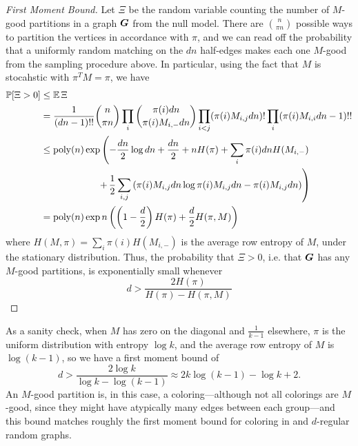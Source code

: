 \begin{proof}[First Moment Bound]
    Let $\Xi$ be the random variable counting the number of $M$-good partitions in a graph $\boldsymbol{G}$ from the null model. There are ${n \choose \pi n}$ possible ways to partition the vertices in accordance with $\pi$, and we can read off the probability that a uniformly random matching on the $dn$ half-edges makes each one $M$-good from the sampling procedure above. In particular, using the fact that $M$ is stocahstic with $\pi^T M = \pi$, we have
    \begin{align*}
        \mathbb{P}[\Xi > 0] 
        &\le \operatorname*{\mathbb{E}}\Xi \\
        &= \frac{1}{(dn-1)!!} {n\choose \pi n} \prod_i {\pi(i)dn \choose \pi(i)M_{i,-}dn} \prod_{i<j}(\pi(i)M_{i,j}dn)! \prod_i (\pi(i)M_{i,i}dn - 1)!! \\
        &\le\operatorname{poly}(n) \exp\left(-\frac{dn}{2}\log dn + \frac{dn}{2} + nH(\pi) + \sum_i \pi(i)dn H(M_{i,-}) \right. \\
        &\qquad\qquad\qquad \left. +\, \frac{1}{2}\sum_{i,j}\left(\pi(i)M_{i,j}dn\log\pi(i)M_{i,j}dn - \pi(i)M_{i,j}dn\right)\right) \\
        &=\operatorname{poly}(n)\exp n\left(\left(1-\frac{d}{2}\right)H(\pi) + \frac{d}{2}H(\pi,M)\right)
    \end{align*} 
    where $H(M,\pi) = \sum_i \pi(i)H(M_{i,-})$ is the average row entropy of $M$, under the stationary distribution. Thus, the probability that $\Xi >0$, i.e. that $\boldsymbol{G}$ has any $M$-good partitions, is exponentially small whenever
    $$
       d > \frac{2H(\pi)}{H(\pi) - H(\pi,M)}
    $$
\end{proof}

\begin{remark}
    As a sanity check, when $M$ has zero on the diagonal and $\tfrac{1}{k-1}$ elsewhere, $\pi$ is the uniform distribution with entropy $\log k$, and the average row entropy of $M$ is $\log(k-1)$, so we have a first moment bound of
    $$
        d>\frac{2\log k}{\log k - \log(k-1)} \approx 2k\log (k-1)-\log k + 2.
    $$
    An $M$-good partition is, in this case, a coloring---although not all colorings are $M$-good, since they might have atypically many edges between each group---and this bound matches roughly the first moment bound for coloring in \ER and $d$-regular random graphs.
\end{remark}